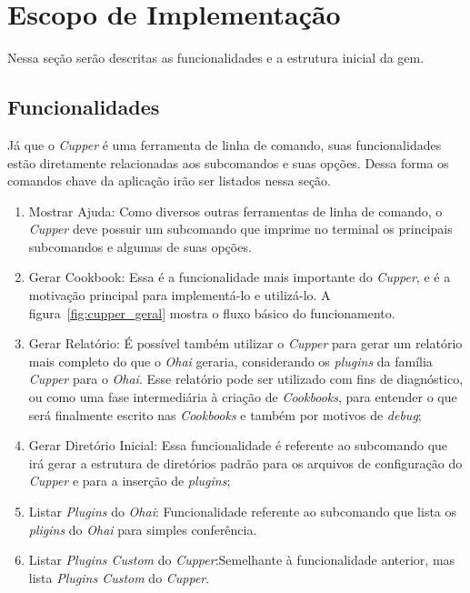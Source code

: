 \section{Escopo de Implementação}
\label{sec:escopo}
Nessa seção serão descritas as funcionalidades e a estrutura inicial da gem.

\subsection{Funcionalidades}

Já que o \textit{Cupper} é uma ferramenta de linha de comando, suas funcionalidades
estão diretamente relacionadas aos subcomandos e suas opções. Dessa forma os
comandos chave da aplicação irão ser listados nessa seção.

\begin{enumerate}
  \item Mostrar Ajuda: Como diversos outras ferramentas de linha de comando, o \textit{Cupper} deve possuir
    um subcomando que imprime no terminal os principais subcomandos e algumas de 
    suas opções.
  \item Gerar Cookbook: Essa é a funcionalidade mais importante do \textit{Cupper}, e é a motivação
    principal para implementá-lo e utilizá-lo. A figura~\ref{fig:cupper_geral} mostra
    o fluxo básico do funcionamento.
  \item Gerar Relatório: É possível também utilizar o \textit{Cupper} para gerar um relatório mais
    completo do que o \textit{Ohai} geraria, considerando os \textit{plugins} da família \textit{Cupper} para o \textit{Ohai}.
    Esse relatório pode ser utilizado com fins de diagnóstico, ou como uma fase 
    intermediária à criação de \textit{Cookbooks}, para entender o que será finalmente 
    escrito nas \textit{Cookbooks} e também por motivos de \textit{debug};
  \item Gerar Diretório Inicial: Essa funcionalidade é referente ao subcomando que irá
    gerar a estrutura de diretórios padrão para os arquivos de configuração do \textit{Cupper}
    e para a inserção de \textit{plugins};
  \item Listar \textit{Plugins} do \textit{Ohai}: Funcionalidade referente ao subcomando que
    lista os \textit{pligins} do \textit{Ohai} para simples conferência.
  \item Listar \textit{Plugins Custom} do \textit{Cupper}:Semelhante à funcionalidade anterior,
    mas lista \textit{Plugins Custom} do \textit{Cupper}.
\end{enumerate}

